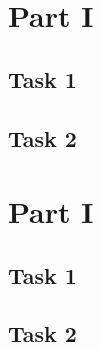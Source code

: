 \documentclass[a4paper]{article}
\begin{document}



\section{Part I} %

\subsection{Task 1}
\blindtext %

\subsection{Task 2}
\blindtext %

\section{Part I} %

\subsection{Task 1}
\blindtext %

\subsection{Task 2}
\blindtext %
\cite{DUMMY1} %



\end{document}
